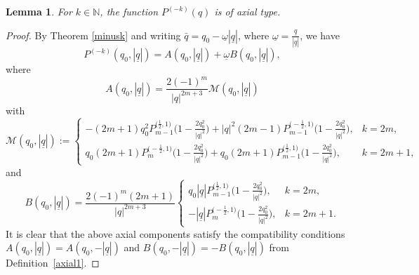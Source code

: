 \documentclass[reqno,11pt]{amsart}
\newtheorem{lemma}[theorem]{Lemma}
\theoremstyle{definition}
\begin{document}
\begin{lemma}
\label{axiall}
For $k \in \mathbb{N}$, the function $P^{(-k)}(q)$ is of axial type.
\end{lemma}
\begin{proof}
By Theorem \ref{minusk} and writing $\bar{q}=q_0-\underline{\omega}|\underline{q}|$, where $ \underline{\omega}= \frac{\underline{q}}{|\underline{q}|}$, we have
\[
P^{(-k)}(q_0, |\underline{q}|)=A(q_0, |\underline{q}|)+ \underline{\omega} B(q_0, |\underline{q}|),
\]
where
\[
A(q_0, |\underline{q}|)=\frac{2 (-1)^m}{|q|^{2m+3}}\mathcal{M}(q_0, |\underline{q}|)
\]
with
\[
\mathcal{M}(q_0, |\underline{q}|):=\begin{cases}
-(2m+1)q_0^2 P_{m-1}^{\big(\frac{1}{2},1\big)}\Big(1-\frac{2q_0^2}{|q|^2}\Big)+ |q|^2 (2m-1)P_{m-1}^{\big(-\frac{1}{2},1\big)}\Big(1-\frac{2q_0^2}{|q|^2}\Big), & k=2m,\\
q_0 (2m+1)P_{m}^{\big(-\frac{1}{2},1\big)}\Big(1-\frac{2q_0^2}{|q|^2}\Big)+q_0 (2m+1)P_{m-1}^{\big(\frac{1}{2},1\big)}\Big(1-\frac{2q_0^2}{|q|^2}\Big), & k=2m+1,
\end{cases}
\]
and
\[
B(q_0, |\underline{q}|)= \frac{2 (-1)^{m}(2m +1)}{|q|^{2m+3}}\begin{cases}
q_0 |\underline{q}|P_{m-1}^{\big(\frac{1}{2},1\big)}\Big(1-\frac{2q_0^2}{|q|^2}\Big), & k=2m,\\
-|\underline{q}|P_{m}^{\big(-\frac{1}{2},1\big)}\Big(1-\frac{2q_0^2}{|q|^2}\Big), & k=2m+1.
\end{cases}
\]
It is clear that the above axial components satisfy the compatibility conditions $A(q_0, |\underline{q}|)=A(q_0,-|\underline{q}|)$ and $B(q_0,-|\underline{q}|)=-B(q_0,|\underline{q}|)$ from Definition~\ref{axial1}.
\end{proof}
\end{document}
